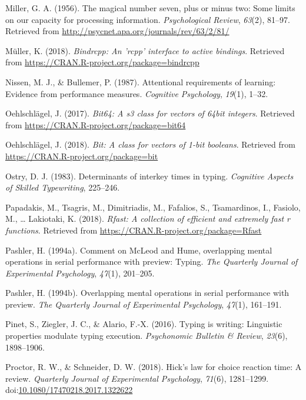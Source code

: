 \documentclass[floatsintext,man]{apa6}
\theoremstyle{definition}
\theoremstyle{definition}
\theoremstyle{definition}
\theoremstyle{remark}
\begin{document}
\hypertarget{ref-miller_magical_1956}{}
Miller, G. A. (1956). The magical number seven, plus or minus two: Some
limits on our capacity for processing information. \emph{Psychological
Review}, \emph{63}(2), 81--97. Retrieved from
\url{http://psycnet.apa.org/journals/rev/63/2/81/}

\hypertarget{ref-R-bindrcpp}{}
Müller, K. (2018). \emph{Bindrcpp: An 'rcpp' interface to active
bindings}. Retrieved from
\url{https://CRAN.R-project.org/package=bindrcpp}

\hypertarget{ref-NissenAttentionalrequirementslearning1987}{}
Nissen, M. J., \& Bullemer, P. (1987). Attentional requirements of
learning: Evidence from performance measures. \emph{Cognitive
Psychology}, \emph{19}(1), 1--32.

\hypertarget{ref-R-bit64}{}
Oehlschlägel, J. (2017). \emph{Bit64: A s3 class for vectors of 64bit
integers}. Retrieved from \url{https://CRAN.R-project.org/package=bit64}

\hypertarget{ref-R-bit}{}
Oehlschlägel, J. (2018). \emph{Bit: A class for vectors of 1-bit
booleans}. Retrieved from \url{https://CRAN.R-project.org/package=bit}

\hypertarget{ref-OstryDeterminantsinterkeytimes1983}{}
Ostry, D. J. (1983). Determinants of interkey times in typing.
\emph{Cognitive Aspects of Skilled Typewriting}, 225--246.

\hypertarget{ref-R-Rfast}{}
Papadakis, M., Tsagris, M., Dimitriadis, M., Fafalios, S., Tsamardinos,
I., Fasiolo, M., \ldots{} Lakiotaki, K. (2018). \emph{Rfast: A
collection of efficient and extremely fast r functions}. Retrieved from
\url{https://CRAN.R-project.org/package=Rfast}

\hypertarget{ref-pashler_comment_1994}{}
Pashler, H. (1994a). Comment on McLeod and Hume, overlapping mental
operations in serial performance with preview: Typing. \emph{The
Quarterly Journal of Experimental Psychology}, \emph{47}(1), 201--205.

\hypertarget{ref-pashler_overlapping_1994}{}
Pashler, H. (1994b). Overlapping mental operations in serial performance
with preview. \emph{The Quarterly Journal of Experimental Psychology},
\emph{47}(1), 161--191.

\hypertarget{ref-PinetTypingwritingLinguistic2016}{}
Pinet, S., Ziegler, J. C., \& Alario, F.-X. (2016). Typing is writing:
Linguistic properties modulate typing execution. \emph{Psychonomic
Bulletin \& Review}, \emph{23}(6), 1898--1906.

\hypertarget{ref-proctor_hicks_2018}{}
Proctor, R. W., \& Schneider, D. W. (2018). Hick's law for choice
reaction time: A review. \emph{Quarterly Journal of Experimental
Psychology}, \emph{71}(6), 1281--1299.
doi:\href{https://doi.org/10.1080/17470218.2017.1322622}{10.1080/17470218.2017.1322622}
\end{document}
